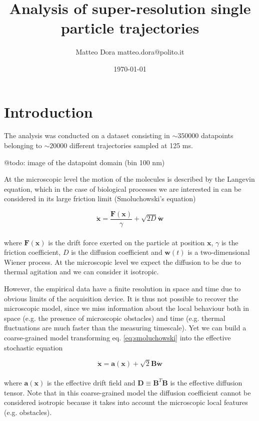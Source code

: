 \documentclass[a4paper]{article}
\title{Analysis of super-resolution single particle trajectories}
\author{Matteo Dora \mbox{matteo.dora@polito.it}}
\date{\today}
\begin{document}
\maketitle

\section{Introduction}

The analysis was conducted on a dataset consisting in $\sim 350 000$ datapoints belonging to $\sim 20 000$ different trajectories sampled at 125 ms.

@todo: image of the datapoint domain (bin 100 nm)

At the microscopic level the motion of the molecules is described by the Langevin equation, which in the case of biological processes we are interested in can be considered in its large friction limit (Smoluchowski's equation)

\begin{equation} \label{eq:smoluchowski}
\dot{\bm{x}} = \frac{\bm{F}(\bm{x})}{\gamma} + \sqrt{2D} \dot{\bm{w}}
\end{equation}
\\
where $\bm{F}(\bm{x})$ is the drift force exerted on the particle at position $\bm{x}$, $\gamma$ is the friction coefficient, $D$ is the diffusion coefficient and $\bm{w}(t)$ is a two-dimensional Wiener process. At the microscopic level we expect the diffusion to be due to thermal agitation and we can consider it isotropic.

However, the empirical data have a finite resolution in space and time due to obvious limits of the acquisition device. It is thus not possible to recover the microscopic model, since we miss information about the local behaviour both in space (e.g. the presence of microscopic obstacles) and time (e.g. thermal fluctuations are much faster than the measuring timescale). Yet we can build a coarse-grained model transforming eq. \ref{eq:smoluchowski} into the effective stochastic equation \cite{hoze2012} \cite{hoze2014}

\begin{equation} \label{eq:coarse-grained}
\dot{\bm{x}} = \bm{a}(\bm{x}) + \sqrt{2}\bm{B} \dot{\bm{w}}
\end{equation}
\\
where $\bm{a}(\bm{x})$ is the effective drift field and $\bm{D} \equiv \bm{B}^T\bm{B}$ is the effective diffusion tensor. Note that in this coarse-grained model the diffusion coefficient cannot be considered isotropic because it takes into account the microscopic local features (e.g. obstacles).
\end{document}

